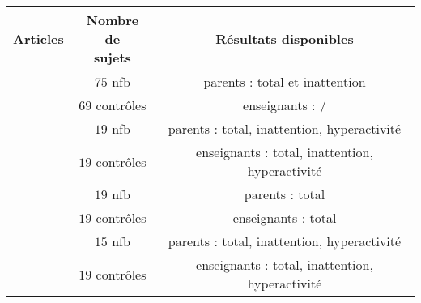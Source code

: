 \begin{tabular}{ccc}
\toprule
Articles & \shortstack{ Nombre de \\ sujets} & Résultats disponibles \\
\toprule
\multirow{2}{*}{ \citet{Aggensteiner2019} } & $75$ \gls{nfb} & parents : total et inattention \\
                                          & $69$ contrôles & enseignants : / \\		
\midrule
\multirow{2}{*}{ \citet{Minder2018} } &  $19$ \gls{nfb} & parents : total, inattention, hyperactivité \\
                                      & $19$ contrôles & enseignants : total, inattention, hyperactivité \\ 
\midrule
\multirow{2}{*}{ \citet{Moreno2019} } & $19$ \gls{nfb} & parents : total \\
                                      & $19$ contrôles & enseignants : total \\
\midrule
\multirow{2}{*}{ \citet{Shereena2019} } & $15$ \gls{nfb} & parents : total, inattention, hyperactivité \\
                                      & $19$ contrôles & enseignants : total, inattention, hyperactivité \\
\bottomrule
\end{tabular}
